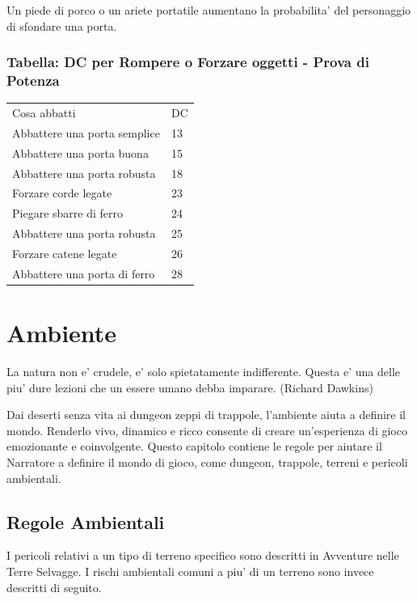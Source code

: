 \documentclass[a4paper,11pt,twoside,openany]{dndbook}
\begin{document}
{\bigskip

Un piede di porco o un ariete portatile aumentano la probabilita' del personaggio di sfondare una porta.

\subsubsection{Tabella: DC per Rompere o Forzare oggetti - Prova di Potenza}

\label{tabella-dc-per-rompere-o-forzare-oggetti---prova-di-potenza}
\bigskip
\begin{tabular}[c]{@{}ll@{}}
\toprule 
Cosa abbatti & DC\tabularnewline
Abbattere una porta semplice & 13\tabularnewline
Abbattere una porta buona & 15\tabularnewline
Abbattere una porta robusta & 18\tabularnewline
Forzare corde legate & 23\tabularnewline
Piegare sbarre di ferro & 24\tabularnewline
Abbattere una porta robusta & 25\tabularnewline
Forzare catene legate & 26\tabularnewline
Abbattere una porta di ferro & 28\tabularnewline
\bottomrule
\end{tabular}
\bigskip

\pagebreak

\section{Ambiente}

\label{ambiente}
\begin{quotebox}
La natura non e' crudele, e' solo spietatamente indifferente. Questa e' una delle piu' dure lezioni che un essere umano debba imparare. (Richard Dawkins)
\end{quotebox}

Dai deserti senza vita ai dungeon zeppi di trappole, l'ambiente aiuta a definire il mondo. Renderlo vivo, dinamico e ricco consente di creare un'esperienza di gioco emozionante e coinvolgente. Questo capitolo contiene le regole per aiutare il Narratore a definire il mondo di gioco, come dungeon, trappole, terreni e pericoli ambientali.

\subsection{Regole Ambientali}

\label{regole-ambientali}

I pericoli relativi a un tipo di terreno specifico sono descritti in Avventure nelle Terre Selvagge. I rischi ambientali comuni a piu' di un terreno sono invece descritti di seguito.

}
\end{document}
